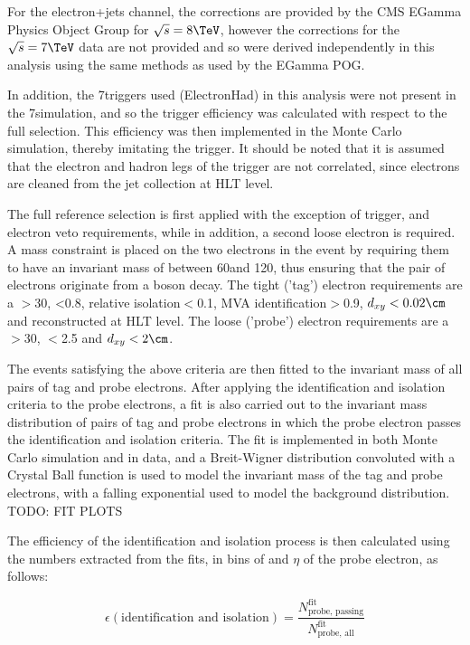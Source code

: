 For the electron+jets channel, the corrections are provided by the CMS EGamma Physics Object Group for
$\sqrt{s}=8\TeV$, however the corrections for the $\sqrt{s}=7\TeV$ data are not provided and so were derived
independently in this analysis using the same methods as used by the EGamma POG.

In addition, the 7\TeV triggers used (ElectronHad) in this analysis were not present in the 7\TeV simulation,
and so the trigger efficiency was calculated with respect to the full selection. This efficiency was then implemented in
the Monte Carlo simulation, thereby imitating the trigger. It should be noted that it is assumed that the
electron and hadron legs of the trigger are not correlated, since electrons are cleaned from the jet
collection at HLT level.

The full reference selection is first applied with the exception of trigger, \btagging and electron veto
requirements, while in addition, a second loose electron is required. A \Z mass constraint is placed on the
two electrons in the event by requiring them to have an invariant mass of between 60\GeV and 120\GeV, thus
ensuring that the pair of electrons originate from a \Z boson decay. The tight ('tag') electron requirements
are a \pt$>$30\GeV, \abseta<0.8, relative isolation$<$0.1, MVA identification$>$0.9, $d_{xy}<0.02\cm$ and
reconstructed at HLT level. The loose ('probe') electron requirements are a \pt$>$30\GeV, \abseta$<$2.5 and
$d_{xy}<2\cm$.

The events satisfying the above criteria are then fitted to the invariant mass of all pairs of tag and probe
electrons. After applying the identification and isolation criteria to the probe electrons, a fit is also
carried out to the invariant mass distribution of pairs of tag and probe electrons in which the probe electron
passes the identification and isolation criteria. The fit is implemented in both Monte Carlo simulation
and in data, and a Breit-Wigner distribution convoluted with a Crystal Ball function is used to model the
invariant mass of the tag and probe electrons, with a falling exponential used to model the background distribution.
TODO: FIT PLOTS %

The efficiency of the identification and isolation process is then calculated using the numbers extracted
from the fits, in bins of \pt and $\eta$ of the probe electron, as follows:

\begin{equation}
\epsilon(\text{identification and isolation}) = \frac{N^{\text{fit}}_{\text{probe, passing}}}{N^{\text{fit}}_{\text{probe, all}}}
\end{equation}

